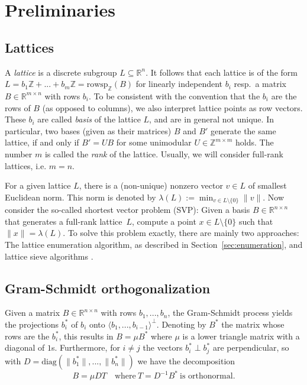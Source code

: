 \documentclass{scrartcl}
\newcommand{\Z}{\mathbb{Z}}
\newcommand{\R}{\mathbb{R}}
\begin{document}
    \section{Preliminaries}

    \subsection{Lattices}

    A \emph{lattice} is a discrete subgroup $L \subseteq \R^n$. 
    It follows that each lattice is of the form $L = b_1 \Z + ... + b_m \Z = \mathrm{rowsp}_{\Z}(B)$ for linearly independent $b_i$ resp.\ a matrix $B \in \R^{m \times n}$ with rows $b_i$.
    To be consistent with the convention that the $b_i$ are the rows of $B$ (as opposed to columns), we also interpret lattice points as row vectors. 
    These $b_i$ are called \emph{basis} of the lattice $L$, and are in general not unique. 
    In particular, two bases (given as their matrices) $B$ and $B'$ generate the same lattice, if and only if $B' = UB$ for some unimodular $U \in \Z^{m \times m}$ holds.
    The number $m$ is called the \emph{rank} of the lattice. Usually, we will consider full-rank lattices, i.e. $m = n$.

    For a given lattice $L$, there is a (non-unique) nonzero vector $v \in L$ of smallest Euclidean norm. This norm is denoted by $\lambda(L) := \min_{v \in L \setminus \{0\}} \| v \|$. 
    Now consider the so-called shortest vector problem (SVP): Given a basis $B \in \R^{n \times n}$ that generates a full-rank lattice~$L$, compute a point $x \in L \setminus \{0\}$ such that $\| x \| = \lambda(L)$. 
    To solve this problem exactly, there are mainly two approaches: The lattice enumeration algorithm, as described in Section~\ref{sec:enumeration}, and lattice sieve algorithms \cite{sieve, g6k}.

    \subsection{Gram-Schmidt orthogonalization}

    Given a matrix $B \in \R^{n \times n}$ with rows $b_1, ..., b_n$, the Gram-Schmidt process yields the projections $b^*_i$ of $b_i$ onto $\langle b_1, ..., b_{i - 1} \rangle ^ \perp$. 
    Denoting by $B^*$ the matrix whose rows are the $b^*_i$, this results in $B = \mu B^*$ where $\mu$ is a lower triangle matrix with a diagonal of $1$s. 
    Furthermore, for $i \neq j$ the vectors $b^*_i \perp b^*_j$ are perpendicular, so with $D = \mathrm{diag}( \|b^*_1\|, ..., \|b^*_n\| )$ we have the decomposition
    \begin{equation*}
        B = \mu D T \quad \text{where} \ T = D^{-1} B^* \ \text{is orthonormal.}
    \end{equation*}
\end{document}
